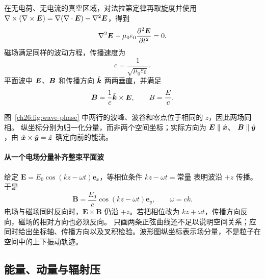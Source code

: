 {在无电荷、无电流的真空区域，对法拉第定律再取旋度并使用
$\nabla\times(\nabla\times\bm{E})=\nabla(\nabla\cdot\bm{E})-\nabla^2\bm{E}$，得到
\begin{equation}
 \nabla^2\bm{E}-\mu_0\varepsilon_0\frac{\partial^2\bm{E}}{\partial t^2}=0.
\end{equation}
磁场满足同样的波动方程，传播速度为
\begin{equation}
 c=\frac1{\sqrt{\mu_0\varepsilon_0}}.
\end{equation}
平面波中 $\bm{E}$、$\bm{B}$ 和传播方向 $\hat{\bm{k}}$ 两两垂直，并满足
\begin{equation}
 \bm{B}=\frac1c\hat{\bm{k}}\times\bm{E},
 \qquad B=\frac Ec.
\end{equation}

\begin{center}
\end{center}
图~\ref{ch26:fig:wave-phase} 中两行的波峰、波谷和零点位于相同的 $z$，因此两场同相。
纵坐标分别为归一化分量，而非两个空间坐标；实际方向为 $\bm{E}\parallel\hat{\bm{x}}$、
$\bm{B}\parallel\hat{\bm{y}}$，由 $\hat{\bm{x}}\times\hat{\bm{y}}=\hat{\bm{z}}$ 确定向前的能流。


\paragraph{从一个电场分量补齐整束平面波}
给定 $\boldsymbol E=E_0\cos(kz-\omega t)\boldsymbol e_x$，等相位条件 $kz-\omega t=\text{常量}$ 表明波沿 $+z$ 传播。于是
\[
 \boldsymbol B=\frac{E_0}{c}\cos(kz-\omega t)\boldsymbol e_y,
 \qquad \omega=ck.
\]
电场与磁场同时反向时，$\boldsymbol E\times\boldsymbol B$ 仍沿 $+z$。若把相位改为 $kz+\omega t$，传播方向反向，磁场的相对方向也必须反向。
只画两条正弦曲线还不足以说明空间关系；应同时给出坐标轴、传播方向以及叉积检验。波形图纵坐标表示场分量，不是粒子在空间中的上下振动轨迹。


\subsection{能量、动量与辐射压}


}
